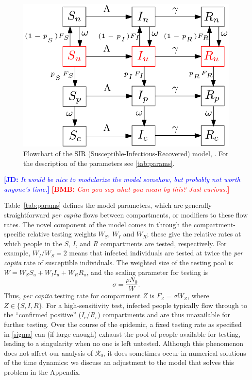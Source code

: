 \documentclass[12pt]{article}
\newcommand{\comment}{\showcomment}
\newcommand{\showcomment}[3]{\textcolor{#1}{\textbf{[#2: }\textsl{#3}\textbf{]}}}
\newcommand{\jd}[1]{\comment{blue}{JD}{#1}}
\newcommand{\bmb}[1]{\comment{red}{BMB}{#1}}
\newcommand{\Rnum}{\mathcal{R}_0}
\theoremstyle{definition} %
\begin{document}
\begin{figure}[!h] 
\begin{center} 
\includegraphics[scale=0.3]{./pix/sir_comp.png}
\caption{\small Flowchart of the SIR (Susceptible-Infectious-Recovered) model, . For the description of the parameters see \cref{tab:params}.
\label{fig:flowchart}}
\end{center} 
\end{figure}

\jd{It would be nice to modularize the model somehow, but probably not worth anyone's time.}
\bmb{Can you say what you mean by this? Just curious.}

Table~\ref{tab:params} defines the model parameters, which are generally straightforward
\emph{per capita} flows between compartments, or modifiers to these flow rates.
The novel component of the model comes in through the compartment-specific relative testing weights $W_S$, $W_I$ and $W_R$; these give the relative rates at which people in the $S$, $I$, and $R$ compartments are tested, respectively. For example, $W_I/W_S=2$ means that infected individuals are tested at twice the \emph{per capita} rate of susceptible individuals. The weighted size of the testing pool is $W = W_S S_u + W_I I_u + W_R R_u$, and the scaling parameter for testing is
\begin{equation}
\label{sigma}
\sigma = \frac{\rho N_0}{W}.
\end{equation}
Thus, \emph{per capita} testing rate for compartment $Z$ is $F_Z=\sigma W_Z$, where $Z \in \{S,I,R\}$.
For a high-sensitivity test, infected people typically flow through to the ``confirmed positive'' ($I_c$/$R_c$) compartments and are thus unavailable for further testing.
Over the course of the epidemic, a fixed testing rate as specified in \eqref{sigma} can
(if large enough) exhaust the pool of people available for testing,
leading to a singularity when no one is left untested.
Although this phenomenon does not affect our analysis of $\Rnum$, it does sometimes occur in
numerical solutions of the time dynamics: we discuss an adjustment to the model that solves
this problem in the Appendix. 
\end{document}
